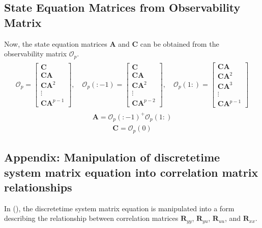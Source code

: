 \documentclass[letterpaper,10pt,english]{sphinxmanual}
\begin{document}
\subsection{State Equation Matrices from Observability Matrix}
\label{\detokenize{theory/srim:state-equation-matrices-from-observability-matrix}}
\sphinxAtStartPar
Now, the state equation matrices \(\mathbf{A}\) and
\(\mathbf{C}\) can be obtained from the observability matrix
\(\mathcal{O}_p\).
\begin{equation*}
\begin{split}\begin{aligned}
\mathcal{O}_{p}
=
\begin{bmatrix}
\mathbf{C} \\
\mathbf{CA} \\
\mathbf{CA}^{2} \\
\vdots \\
\mathbf{CA}^{p-1}
\end{bmatrix}
, \quad{}
\mathcal{O}_{p}(:-1)
=
\begin{bmatrix}
\mathbf{C} \\
\mathbf{CA} \\
\mathbf{CA}^{2} \\
\vdots \\
\mathbf{CA}^{p-2}
\end{bmatrix}
, \quad{}
\mathcal{O}_{p}(1:)
=
\begin{bmatrix}
\mathbf{CA} \\
\mathbf{CA}^{2} \\
\mathbf{CA}^{3} \\
\vdots \\
\mathbf{CA}^{p-1}
\end{bmatrix}
\end{aligned}\end{split}
\end{equation*}\begin{equation*}
\begin{split}\mathbf{A} = \mathcal{O}_{p}(:-1)^{+}\mathcal{O}_{p}(1:)\end{split}
\end{equation*}\begin{equation*}
\begin{split}\mathbf{C} = \mathcal{O}_{p}(0)\end{split}
\end{equation*}

\subsection{Appendix: Manipulation of discrete\sphinxhyphen{}time system matrix equation into correlation matrix relationships}
\label{\detokenize{theory/srim:appendix-manipulation-of-discrete-time-system-matrix-equation-into-correlation-matrix-relationships}}
\sphinxAtStartPar
In (), the discrete\sphinxhyphen{}time
system matrix equation is manipulated into a form describing the
relationship between correlation matrices \(\mathbf{R}_{yy}\),
\(\mathbf{R}_{yu}\), \(\mathbf{R}_{uu}\), and
\(\mathbf{R}_{xx}\).
\end{document}
